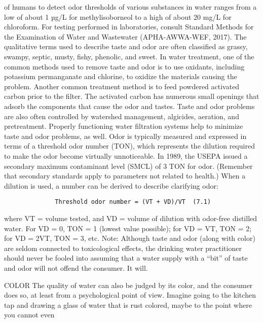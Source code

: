 \documentclass{article}
\begin{document}
of humans to detect odor thresholds of various substances in water
ranges from a low of about 1 µg/L for methylisoborneol to a high of
about 20 mg/L for chloroform. For testing performed in laboratories,
consult Standard Methods for the Examination of Water and Wastewater
(APHA-AWWA-WEF, 2017). The qualitative terms used to describe taste and
odor are often classified as grassy, swampy, septic, musty, fishy,
phenolic, and sweet. In water treatment, one of the common methods used
to remove taste and odor is to use oxidants, including potassium
permanganate and chlorine, to oxidize the materials causing the problem.
Another common treatment method is to feed powdered activated carbon
prior to the filter. The activated carbon has numerous small openings
that adsorb the components that cause the odor and tastes. Taste and
odor problems are also often controlled by watershed management,
algicides, aeration, and pretreatment. Properly functioning water
filtration systems help to minimize taste and odor problems, as well.
Odor is typically measured and expressed in terms of a threshold odor
number (TON), which represents the dilution required to make the odor
become virtually unnoticeable. In 1989, the USEPA issued a secondary
maximum contaminant level (SMCL) of 3 TON for odor. (Remember that
secondary standards apply to parameters not related to health.) When a
dilution is used, a number can be derived to describe clarifying odor:

\begin{verbatim}
              Threshold odor number = (VT + VD)/VT  (7.1)
\end{verbatim}

where VT = volume tested, and VD = volume of dilution with odor-free
distilled water. For VD = 0, TON = 1 (lowest value possible); for VD =
VT, TON = 2; for VD = 2VT, TON = 3, etc. Note: Although taste and odor
(along with color) are seldom connected to toxicological effects, the
drinking water practitioner should never be fooled into assuming that a
water supply with a ``bit'' of taste and odor will not offend the
consumer. It will.

COLOR The quality of water can also be judged by its color, and the
consumer does so, at least from a psychological point of view. Imagine
going to the kitchen tap and drawing a glass of water that is rust
colored, maybe to the point where you cannot even
\end{document}
